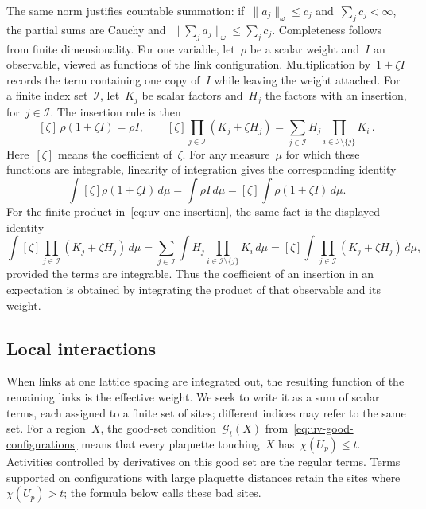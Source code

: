The same norm justifies countable summation: if~$\|a_j\|_\omega\le c_j$ and~$\sum_jc_j<\infty$, the partial sums are Cauchy and~$\|\sum_ja_j\|_\omega\le\sum_jc_j$.
Completeness follows from finite dimensionality.
For one variable, let~$\rho$ be a scalar weight and~$I$ an observable, viewed as functions of the link configuration.
Multiplication by~$1+\zeta I$ records the term containing one copy of~$I$ while leaving the weight attached.
For a finite index set~$\mathcal I$, let~$K_j$ be scalar factors and~$H_j$ the factors with an insertion, for~$j\in\mathcal I$.
The insertion rule is then
\begin{equation}\label{eq:uv-one-insertion}
 [\zeta]\,\rho(1+\zeta I)=\rho I,\qquad
 [\zeta]\prod_{j\in\mathcal I}(K_j+\zeta H_j)
 =\sum_{j\in\mathcal I}H_j\prod_{i\in\mathcal I\setminus\{j\}}K_i\,.
\end{equation}
Here~$[\zeta]$ means the coefficient of~$\zeta$.
For any measure~$\mu$ for which these functions are integrable, linearity of integration gives the corresponding identity
\begin{equation*}
 \int [\zeta]\rho(1+\zeta I)\,d\mu
 =\int\rho I\,d\mu
 =[\zeta]\int\rho(1+\zeta I)\,d\mu.
\end{equation*}
For the finite product in~\eqref{eq:uv-one-insertion}, the same fact is the displayed identity
\begin{equation*}
 \int [\zeta]\prod_{j\in\mathcal I}(K_j+\zeta H_j)\,d\mu
 =\sum_{j\in\mathcal I}\int H_j\prod_{i\in\mathcal I\setminus\{j\}}K_i\,d\mu
 =[\zeta]\int\prod_{j\in\mathcal I}(K_j+\zeta H_j)\,d\mu,
\end{equation*}
provided the terms are integrable.
Thus the coefficient of an insertion in an expectation is obtained by integrating the product of that observable and its weight.

\subsection{Local interactions}\label{subsec:uv-activity-format}

When links at one lattice spacing are integrated out, the resulting function of the remaining links is the effective weight.
We seek to write it as a sum of scalar terms, each assigned to a finite set of sites; different indices may refer to the same set.
For a region~$X$, the good-set condition~$\mathcal G_t(X)$ from~\eqref{eq:uv-good-configurations} means that every plaquette touching~$X$ has~$\chi(U_p)\le t$.
Activities controlled by derivatives on this good set are the regular terms. Terms supported on configurations with large plaquette distances retain the sites where~$\chi(U_p)>t$; the formula below calls these bad sites.

